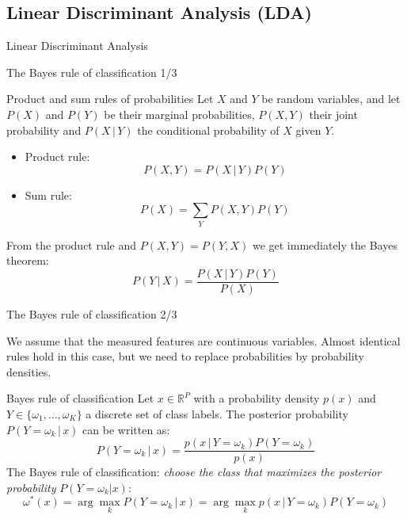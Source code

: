 \documentclass[xcolor=pdftex,dvipsnames,table]{beamer}
\begin{document}
\subsection{Linear Discriminant Analysis (LDA)}
\begin{frame}[plain,c]
\begin{center}
\Huge Linear Discriminant Analysis
\end{center}
\end{frame}


\begin{frame}{The Bayes rule of classification 1/3}
\begin{block}{Product and sum rules of probabilities}
	Let $X$ and $Y$ be random variables, and let $P(X)$ and $P(Y)$ be their marginal probabilities, $P(X,Y)$ their joint probability and $P(X\,|\,Y)$ the conditional probability of $X$ given $Y$.
	\begin{itemize}
		\item Product rule:
		\begin{equation}
			P(X,Y) = P(X\,|\,Y)P(Y)
		\end{equation}
		\item Sum rule:
		\begin{equation}
			P(X) = \sum_Y P(X,Y)P(Y)
		\end{equation}
	\end{itemize}
\end{block}
From the product rule and $P(X,Y)=P(Y,X)$ we get immediately the Bayes theorem:
\begin{equation}
	P(Y \, | \, X) = \frac{P(X \, | \, Y)P(Y)}{P(X)}
\end{equation}
\end{frame}

\begin{frame}{The Bayes rule of classification 2/3}

We assume that the measured features are continuous variables. Almost identical rules hold in this case, but we need to replace probabilities by probability densities.

\begin{block}{Bayes rule of classification}
	Let $x \in \mathbb{R}^P$ with a probability density $p(x)$ and $Y \in \{\omega_1, \ldots, \omega_K\}$ a discrete set of class labels. The posterior probability $P(Y=\omega_k\,|\,x)$ can be written as:
	\begin{equation}
		P(Y=\omega_k \, | \, x) = \frac{p(x \, | \, Y=\omega_k) P(Y=\omega_k)}{p(x)}
	\end{equation}
	The Bayes rule of classification: \emph{choose the class that maximizes the posterior probability} $P(Y=\omega_k|x)$:
	\begin{equation}
		\omega^{\ast}(x) = \arg\max_k P(Y=\omega_k \, | \, x) = \arg\max_k p(x\,|\,Y=\omega_k)P(Y=\omega_k)
	\end{equation}
\end{block}

\end{frame}
\end{document}
